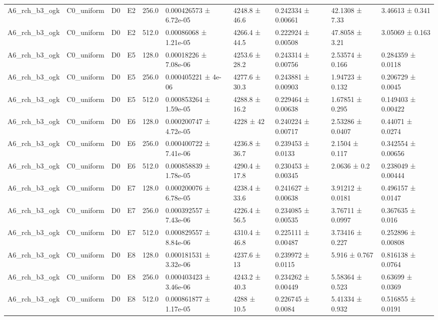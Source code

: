 \begin{table}
\begin{tabular}{llllllllll}
A6\_rch\_b3\_ogk & C0\_uniform & D0 & E2 & 256.0 & 0.000426573 ± 6.72e-05 & 4248.8 ± 46.6 & 0.242334 ± 0.00661 & 42.1308 ± 7.33 & 3.46613 ± 0.341 \\
A6\_rch\_b3\_ogk & C0\_uniform & D0 & E2 & 512.0 & 0.00086068 ± 1.21e-05 & 4266.4 ± 44.5 & 0.222924 ± 0.00508 & 47.8058 ± 3.21 & 3.05069 ± 0.163 \\
A6\_rch\_b3\_ogk & C0\_uniform & D0 & E5 & 128.0 & 0.00018226 ± 7.08e-06 & 4253.6 ± 28.2 & 0.243314 ± 0.00756 & 2.53574 ± 0.166 & 0.284359 ± 0.0118 \\
A6\_rch\_b3\_ogk & C0\_uniform & D0 & E5 & 256.0 & 0.000405221 ± 4e-06 & 4277.6 ± 30.3 & 0.243881 ± 0.00903 & 1.94723 ± 0.132 & 0.206729 ± 0.0045 \\
A6\_rch\_b3\_ogk & C0\_uniform & D0 & E5 & 512.0 & 0.000853264 ± 1.59e-05 & 4288.8 ± 16.2 & 0.229464 ± 0.00638 & 1.67851 ± 0.295 & 0.149403 ± 0.00422 \\
A6\_rch\_b3\_ogk & C0\_uniform & D0 & E6 & 128.0 & 0.000200747 ± 4.72e-05 & 4228 ± 42 & 0.240224 ± 0.00717 & 2.53286 ± 0.0407 & 0.44071 ± 0.0274 \\
A6\_rch\_b3\_ogk & C0\_uniform & D0 & E6 & 256.0 & 0.000400722 ± 7.41e-06 & 4236.8 ± 36.7 & 0.239453 ± 0.0133 & 2.1504 ± 0.117 & 0.342554 ± 0.00656 \\
A6\_rch\_b3\_ogk & C0\_uniform & D0 & E6 & 512.0 & 0.000858839 ± 1.78e-05 & 4290.4 ± 17.8 & 0.230453 ± 0.00345 & 2.0636 ± 0.2 & 0.238049 ± 0.00444 \\
A6\_rch\_b3\_ogk & C0\_uniform & D0 & E7 & 128.0 & 0.000200076 ± 6.78e-05 & 4238.4 ± 33.6 & 0.241627 ± 0.00638 & 3.91212 ± 0.0181 & 0.496157 ± 0.0147 \\
A6\_rch\_b3\_ogk & C0\_uniform & D0 & E7 & 256.0 & 0.000392557 ± 7.43e-06 & 4226.4 ± 56.5 & 0.234085 ± 0.00535 & 3.76711 ± 0.0997 & 0.367635 ± 0.016 \\
A6\_rch\_b3\_ogk & C0\_uniform & D0 & E7 & 512.0 & 0.000829557 ± 8.84e-06 & 4310.4 ± 46.8 & 0.225111 ± 0.00487 & 3.73416 ± 0.227 & 0.252896 ± 0.00808 \\
A6\_rch\_b3\_ogk & C0\_uniform & D0 & E8 & 128.0 & 0.000181531 ± 3.32e-06 & 4237.6 ± 13 & 0.239972 ± 0.0115 & 5.916 ± 0.767 & 0.816138 ± 0.0764 \\
A6\_rch\_b3\_ogk & C0\_uniform & D0 & E8 & 256.0 & 0.000403423 ± 3.46e-06 & 4243.2 ± 40.3 & 0.234262 ± 0.00449 & 5.58364 ± 0.523 & 0.63699 ± 0.0369 \\
A6\_rch\_b3\_ogk & C0\_uniform & D0 & E8 & 512.0 & 0.000861877 ± 1.17e-05 & 4288 ± 10.5 & 0.226745 ± 0.0084 & 5.41334 ± 0.932 & 0.516855 ± 0.0191 \\

\end{tabular}
\end{table}
